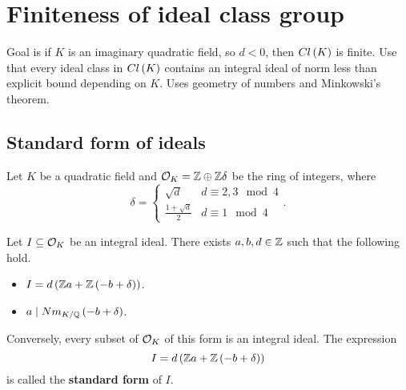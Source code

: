 \section{Finiteness of ideal class group}

Goal is if $ K $ is an imaginary quadratic field, so $ d < 0 $, then $ Cl\left( K \right) $ is finite. Use that every ideal class in $ Cl\left( K \right) $ contains an integral ideal of norm less than explicit bound depending on $ K $. Uses geometry of numbers and Minkowski's theorem.

\subsection{Standard form of ideals}

Let $ K $ be a quadratic field and $ \mathcal{O}_K = \mathbb{Z} \oplus \mathbb{Z}\delta $ be the ring of integers, where
$$ \delta =
\begin{cases}
\sqrt{d} & d \equiv 2, 3 \mod 4 \\
\tfrac{1 + \sqrt{d}}{2} & d \equiv 1 \mod 4
\end{cases}.
$$

\begin{proposition}
Let $ I \subseteq \mathcal{O}_K $ be an integral ideal. There exists $ a, b, d \in \mathbb{Z} $ such that the following hold.
\begin{itemize}
\item $ I = d\left( \mathbb{Z} a + \mathbb{Z}\left( -b + \delta \right) \right) $.
\item $ a \mid Nm_{K / \mathbb{Q}}\left( -b + \delta \right) $.
\end{itemize}
\end{proposition}

Conversely, every subset of $ \mathcal{O}_K $ of this form is an integral ideal. The expression
$$ I = d\left( \mathbb{Z} a + \mathbb{Z}\left( -b + \delta \right) \right) $$
is called the \textbf{standard form} of $ I $.

